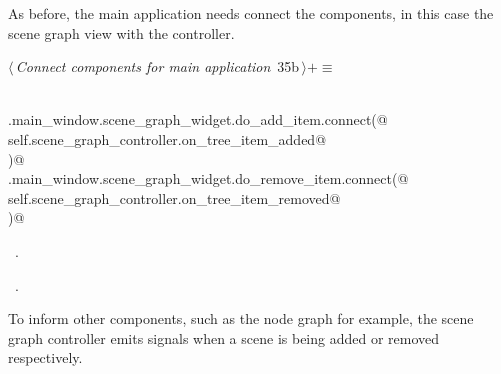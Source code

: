 \documentclass[
    a4paper,      %
    10pt,         %
    openright,    %
    notitlepage,  %
    parskip=half, %
]{scrreprt}       %
\theoremstyle{definition}                    %
\begin{document}
\begin{flushleft}
\begin{minipage}{\linewidth}
\begin{list}{}{\setlength{\itemsep}{-\parsep}\setlength{\itemindent}{-\leftmargin}}
\item{}
\end{list}
\end{minipage}\vspace{4ex}
\end{flushleft}
As before, the main application needs connect the components, in this case the
scene graph view with the controller.

\begin{flushleft} \small
\begin{minipage}{\linewidth}\label{scrap40}\raggedright\small
{} $\langle\,${\itshape Connect components for main application}\nobreak\ {\footnotesize {35b}}$\,\rangle+\equiv$
\vspace{-1ex}
\begin{list}{}{} \item
\mbox{}\lstinline@@\\
\mbox{}\lstinline@self.main_window.scene_graph_widget.do_add_item.connect(@\\
\mbox{}\lstinline@    self.scene_graph_controller.on_tree_item_added@\\
\mbox{}\lstinline@)@\\
\mbox{}\lstinline@self.main_window.scene_graph_widget.do_remove_item.connect(@\\
\mbox{}\lstinline@    self.scene_graph_controller.on_tree_item_removed@\\
\mbox{}\lstinline@)@\\
\mbox{}\lstinline@@{\NWsep}
\end{list}
\vspace{-1.5ex}
\footnotesize
\begin{list}{}{\setlength{\itemsep}{-\parsep}\setlength{\itemindent}{-\leftmargin}}
\item \NWtxtMacroDefBy\ .
\item \NWtxtMacroRefIn\ .

\item{}
\end{list}
\end{minipage}\vspace{4ex}
\end{flushleft}
To inform other components, such as the node graph for example, the scene graph
controller emits signals when a scene is being added or removed respectively.
\end{document}
